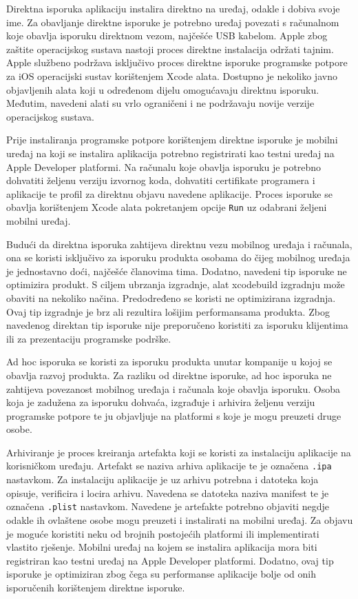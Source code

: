 \documentclass[times, utf8, diplomski, numeric]{fer}
\begin{document}
Direktna isporuka aplikaciju instalira direktno na uređaj, odakle i dobiva svoje ime. Za obavljanje direktne isporuke je potrebno uređaj povezati s računalnom koje obavlja isporuku direktnom vezom, najčešće USB kabelom. Apple zbog zaštite operacijskog sustava nastoji proces direktne instalacija održati tajnim. Apple službeno podržava isključivo proces direktne isporuke programske potpore za iOS operacijski sustav korištenjem Xcode alata. Dostupno je nekoliko javno objavljenih alata koji u određenom dijelu omogućavaju direktnu isporuku. Međutim, navedeni alati su vrlo ograničeni i ne podržavaju novije verzije operacijskog sustava.

Prije instaliranja programske potpore korištenjem direktne isporuke je mobilni uređaj na koji se instalira aplikacija potrebno registrirati kao testni uređaj na Apple Developer platformi. Na računalu koje obavlja isporuku je potrebno dohvatiti željenu verziju izvornog koda, dohvatiti certifikate programera i aplikacije te profil za direktnu objavu navedene aplikacije. Proces isporuke se obavlja korištenjem Xcode alata pokretanjem opcije \verb|Run| uz odabrani željeni mobilni uređaj.

Budući da direktna isporuka zahtijeva direktnu vezu mobilnog uređaja i računala, ona se koristi isključivo za isporuku produkta osobama do čijeg mobilnog uređaja je jednostavno doći, najčešće članovima tima. Dodatno, navedeni tip isporuke ne optimizira produkt. S ciljem ubrzanja izgradnje, alat xcodebuild izgradnju može obaviti na nekoliko načina. Predodređeno se koristi ne optimizirana izgradnja. Ovaj tip izgradnje je brz ali rezultira lošijim performansama produkta. Zbog navedenog direktan tip isporuke nije preporučeno koristiti za isporuku klijentima ili za prezentaciju programske podrške.

Ad hoc isporuka se koristi za isporuku produkta unutar kompanije u kojoj se obavlja razvoj produkta. Za razliku od direktne isporuke, ad hoc isporuka ne zahtijeva povezanost mobilnog uređaja i računala koje obavlja isporuku. Osoba koja je zadužena za isporuku dohvaća, izgrađuje i arhivira željenu verziju programske potpore te ju objavljuje na platformi s koje je mogu preuzeti druge osobe.

Arhiviranje je proces kreiranja artefakta koji se koristi za instalaciju aplikacije na korisničkom uređaju. Artefakt se naziva arhiva aplikacije te je označena \verb|.ipa| nastavkom. Za instalaciju aplikacije je uz arhivu potrebna i datoteka koja opisuje, verificira i locira arhivu. Navedena se datoteka naziva manifest te je označena \verb|.plist| nastavkom. Navedene je artefakte potrebno objaviti negdje odakle ih ovlaštene osobe mogu preuzeti i instalirati na mobilni uređaj. Za objavu je moguće koristiti neku od brojnih postojećih platformi ili implementirati vlastito rješenje. Mobilni uređaj na kojem se instalira aplikacija mora biti registriran kao testni uređaj na Apple Developer platformi. Dodatno, ovaj tip isporuke je optimiziran zbog čega su performanse aplikacije bolje od onih isporučenih korištenjem direktne isporuke.
\end{document}
